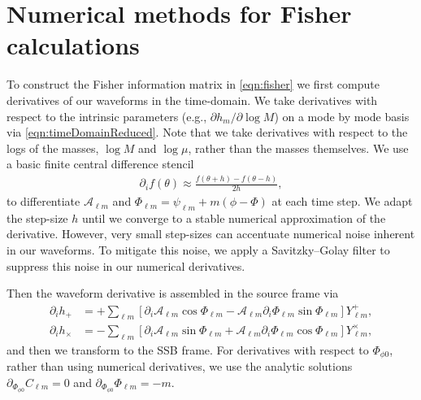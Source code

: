 \documentclass[%
 reprint,
 nofootinbib,
 amsmath,amssymb,
 aps,
 prd,
]{revtex4-2}
\begin{document}
\section{Numerical methods for Fisher calculations}
\label{app:fisher}

To construct the Fisher information matrix in \eqref{eqn:fisher} we first compute derivatives of our waveforms in the time-domain. We take derivatives with respect to the intrinsic parameters (e.g., $\partial h_m /\partial\log M$) on a mode by mode basis via \eqref{eqn:timeDomainReduced}. Note that we take derivatives with respect to the logs of the masses, $\log M$ and $\log \mu$, rather than the masses themselves. We use a basic finite central difference stencil
\begin{align}
    \partial_i f(\theta) \approx \frac{f(\theta + h) - f(\theta - h)}{2h},
\end{align}
to differentiate $\mathcal{A}_{\ell m}$ and $\Phi_{\ell m} = \psi_{\ell m} + m(\phi - \Phi)$ at each time step. We adapt the step-size $h$ until we converge to a stable numerical approximation of the derivative. However, very small step-sizes can accentuate numerical noise inherent in our waveforms. To mitigate this noise, we apply a Savitzky–Golay filter to suppress this noise in our numerical derivatives.

Then the waveform derivative is assembled in the source frame via
\begin{subequations} \label{eqn:timeDomainDerivatives}
    \begin{align}
    \partial_i h_+ &= +\sum_{\ell m} \left[ \partial_i \mathcal{A}_{\ell m} \cos\Phi_{\ell m} - \mathcal{A}_{\ell m} \partial_i \Phi_{\ell m} \sin\Phi_{\ell m}\right] Y^+_{\ell m},
    \\
    \partial_i h_\times &= -\sum_{\ell m} \left[ \partial_i \mathcal{A}_{\ell m} \sin\Phi_{\ell m} + \mathcal{A}_{\ell m} \partial_i \Phi_{\ell m} \cos\Phi_{\ell m}\right] Y^\times_{\ell m},
    \end{align}
\end{subequations}
and then we transform to the SSB frame. For derivatives with respect to $\Phi_{\phi 0}$, rather than using numerical derivatives, we use the analytic solutions $\partial_{\Phi_{\phi 0}} C_{\ell m} = 0$ and $\partial_{\Phi_{\phi 0}} \Phi_{\ell m} = -m$. 
\end{document}
